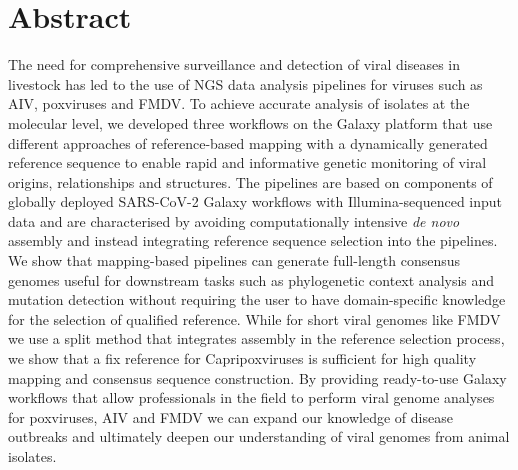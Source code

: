 \chapter*{Abstract}
The need for comprehensive surveillance and detection of viral diseases in livestock has led to the use of \ac{NGS} data analysis pipelines for viruses such as \ac{AIV}, poxviruses and \ac{FMDV}. To achieve accurate analysis of isolates at the molecular level, we developed three workflows on the Galaxy platform that use different approaches of reference-based mapping with a dynamically generated reference sequence to enable rapid and informative genetic monitoring of viral origins, relationships and structures. The pipelines are based on components of globally deployed SARS-CoV-2 Galaxy workflows with Illumina-sequenced input data and are characterised by avoiding computationally intensive \textit{de novo} assembly and instead integrating reference sequence selection into the pipelines. We show that mapping-based pipelines can generate full-length consensus genomes useful for downstream tasks such as phylogenetic context analysis and mutation detection without requiring the user to have domain-specific knowledge for the selection of qualified reference. While for short viral genomes like FMDV we use a split method that integrates assembly in the reference selection process, we show that a fix reference for Capripoxviruses is sufficient for high quality mapping and consensus sequence construction. By providing ready-to-use Galaxy workflows that allow professionals in the field to perform viral genome analyses for poxviruses, AIV and FMDV we can expand our knowledge of disease outbreaks and ultimately deepen our understanding of viral genomes from animal isolates.